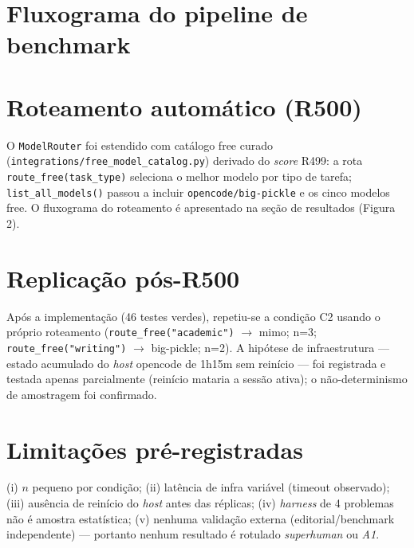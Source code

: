 \section{Fluxograma do pipeline de benchmark}



\section{Roteamento automático (R500)}

O \texttt{ModelRouter} foi estendido com catálogo free curado
(\texttt{integrations/free\_model\_catalog.py}) derivado do \textit{score}
R499: a rota \texttt{route\_free(task\_type)} seleciona o melhor modelo por
tipo de tarefa; \texttt{list\_all\_models()} passou a incluir
\texttt{opencode/big-pickle} e os cinco modelos free. O fluxograma do
roteamento é apresentado na seção de resultados (Figura 2).

\section{Replicação pós-R500}

Após a implementação (46 testes verdes), repetiu-se a condição C2 usando o
próprio roteamento (\texttt{route\_free("academic")} $\rightarrow$ mimo; n=3;
\texttt{route\_free("writing")} $\rightarrow$ big-pickle; n=2). A hipótese de
infraestrutura — estado acumulado do \textit{host} opencode de 1h15m sem
reinício — foi registrada e testada apenas parcialmente (reinício mataria a
sessão ativa); o não-determinismo de amostragem foi confirmado.

\section{Limitações pré-registradas}

(i) $n$ pequeno por condição; (ii) latência de infra variável (timeout
observado); (iii) ausência de reinício do \textit{host} antes das réplicas;
(iv) \textit{harness} de 4 problemas não é amostra estatística; (v) nenhuma
validação externa (editorial/benchmark independente) — portanto nenhum
resultado é rotulado \textit{superhuman} ou \textit{A1}.